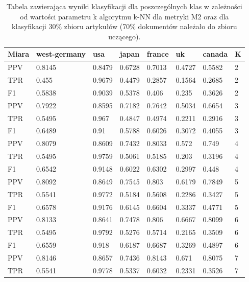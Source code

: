 \documentclass{classrep}
\begin{document}
\begin{table}[H]
    \centering
\caption{Tabela zawierająca wyniki klasyfikacji dla poszczególnych klas w zależności od wartości parametru k algorytmu k-NN dla metryki M2 oraz dla klasyfikacji 30\% zbioru artykułów (70\% dokumentów należało do zbioru uczącego).}
\begin{adjustbox}{max width=\textwidth}
    \begin{tabular}{|l|l|l|l|l|l|l|l|}
    \hline
        Miara & west-germany  & usa  & japan & france & uk & canada & K \\ \hline
        PPV & 0.8145 & 0.8479 & 0.6728 & 0.7013 & 0.4727 & 0.5582 & 2 \\ \hline
        TPR & 0.455 & 0.9679 & 0.4479 & 0.2857 & 0.1564 & 0.2685 & 2 \\ \hline
        F1 & 0.5838 & 0.9039 & 0.5378 & 0.406 & 0.235 & 0.3626 & 2 \\ \hline
        PPV & 0.7922 & 0.8595 & 0.7182 & 0.7642 & 0.5034 & 0.6654 & 3 \\ \hline
        TPR & 0.5495 & 0.967 & 0.4847 & 0.4974 & 0.2211 & 0.2916 & 3 \\ \hline
        F1 & 0.6489 & 0.91 & 0.5788 & 0.6026 & 0.3072 & 0.4055 & 3 \\ \hline
        PPV & 0.8079 & 0.8609 & 0.7432 & 0.8033 & 0.572 & 0.749 & 4 \\ \hline
        TPR & 0.5495 & 0.9759 & 0.5061 & 0.5185 & 0.203 & 0.3196 & 4 \\ \hline
        F1 & 0.6542 & 0.9148 & 0.6022 & 0.6302 & 0.2997 & 0.448 & 4 \\ \hline
        PPV & 0.8092 & 0.8649 & 0.7545 & 0.803 & 0.6179 & 0.7849 & 5 \\ \hline
        TPR & 0.5541 & 0.9772 & 0.5184 & 0.5608 & 0.2286 & 0.3427 & 5 \\ \hline
        F1 & 0.6578 & 0.9176 & 0.6145 & 0.6604 & 0.3337 & 0.4771 & 5 \\ \hline
        PPV & 0.8133 & 0.8641 & 0.7478 & 0.806 & 0.6667 & 0.8099 & 6 \\ \hline
        TPR & 0.5495 & 0.9792 & 0.5276 & 0.5714 & 0.2165 & 0.3509 & 6 \\ \hline
        F1 & 0.6559 & 0.918 & 0.6187 & 0.6687 & 0.3269 & 0.4897 & 6 \\ \hline
        PPV & 0.8146 & 0.8657 & 0.7436 & 0.8143 & 0.671 & 0.8075 & 7 \\ \hline
        TPR & 0.5541 & 0.9778 & 0.5337 & 0.6032 & 0.2331 & 0.3526 & 7 \\ \hline

\end{tabular}
\end{adjustbox}
\end{table}
\end{document}
